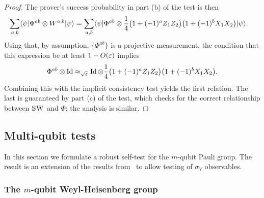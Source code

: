 \begin{proof}
The prover's success probability in part (b) of the test is then
\begin{align*}
\sum_{a,b} \langle\psi| \Phi^{ab} \otimes W^{a,b} |\psi\rangle &= \sum_{a,b} \langle\psi| \Phi^{ab} \otimes \frac{1}{4} \big(1+(-1)^a Z_1Z_2\big)\big(1+(-1)^bX_1X_2\big) |\psi\rangle.
\end{align*}
Using that, by assumption, $\{\Phi^{ab}\}$ is a projective measurement, the condition that this expression be at least $1-O(\varepsilon)$ implies 
$$\Phi^{ab} \otimes \mathop{\rm Id}\nolimits \approx_{\sqrt{\varepsilon}}\mathop{\rm Id}\nolimits \otimes \frac{1}{4}\big(1+(-1)^a Z_1Z_2\big)\big(1+(-1)^bX_1X_2\big).$$ 
Combining this with the implicit consistency test yields the first relation. The last is guaranteed by part (c) of the test, which checks for the correct relationship between $\textsc{SW}$ and $\Phi$; the analysis is similar.  
\end{proof}


\subsection{Multi-qubit tests}
\label{sec:pauli-group}

In this section we formulate a robust self-test for the $m$-qubit Pauli group. The result is an extension of the results from~\cite{natarajan2016robust} to allow testing of $\sigma_Y$ observables. 

\subsubsection{The \texorpdfstring{$m$}{m}-qubit Weyl-Heisenberg group}
\label{sec:pbt}

